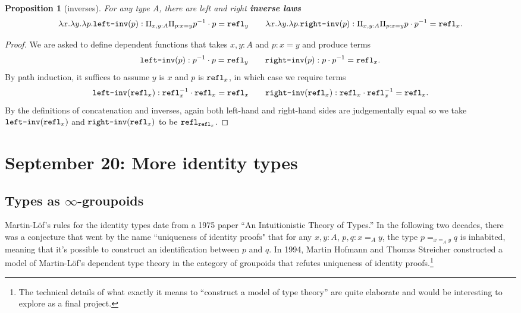 \documentclass{amsart}
\theoremstyle{theorem}
\newtheorem*{prop}{Proposition}
\theoremstyle{definition}
\theoremstyle{remark}
\newcommand{\0}{\mathbbe{0}}
\newcommand{\1}{\mathbbe{1}}
\newcommand{\2}{\mathbbe{2}}
\newcommand{\3}{\mathbbe{3}}
\newcommand{\4}{\mathbbe{4}}
\newcommand{\term}[1]{{\textup{\texttt{#1}}}}
\newcommand{\refl}{\term{refl}}
\begin{document}
\begin{prop}[inverses] For any type $A$, there are left and right \textbf{inverse laws}
\[  \lambda x. \lambda y. \lambda p.\term{left-inv}(p) : \Pi_{x,y :A} \Pi_{p : x= y} p^{-1} \cdot p = \refl_y \qquad  \lambda x. \lambda y. \lambda p.\term{right-inv}(p) : \Pi_{x,y :A} \Pi_{p : x=y} p \cdot p^{-1} = \refl_x.\]
\end{prop}
\begin{proof}
We are asked to define  dependent functions that takes $x, y :A$ and $p : x = y$ and produce terms
\[ \term{left-inv}(p) : p^{-1} \cdot p = \refl_y \qquad \term{right-inv}(p) : p \cdot p^{-1} = \refl_x.\]
By path induction, it suffices to assume $y$ is $x$ and $p$ is $\refl_x$, in which case we require terms
\[ \term{left-inv}(\refl_x) : \refl_x^{-1} \cdot \refl_x = \refl_x \qquad \term{right-inv}(\refl_x) : \refl_x \cdot \refl_x^{-1} = \refl_x.\]
By the definitions of concatenation and inverses, again both left-hand and right-hand sides are judgementally equal so we take $\term{left-inv}(\refl_x)$ and $\term{right-inv}(\refl_x)$ to be $\refl_{\refl_x}$.
\end{proof}

\section*{September 20: More identity types}

\subsection*{Types as \texorpdfstring{$\infty$}{infinity}-groupoids}

Martin-L\"{o}f's rules for the identity types date from a 1975 paper ``An Intuitionistic Theory of Types.'' In the following two decades, there was a conjecture that went by the name ``uniqueness of identity proofs" that for any $x,y : A$, $p, q  : x =_A y$, the type $p =_{x=_A y} q$ is inhabited, meaning that it's possible to construct an identification between $p$ and $q$. In 1994, Martin Hofmann and Thomas Streicher constructed a model of Martin-L\"{o}f's dependent type theory in the category of groupoids that refutes uniqueness of identity proofs.\footnote{The technical details of what exactly it means to ``construct a model of type theory'' are quite elaborate and would be interesting to explore as a final project.}
\end{document}
